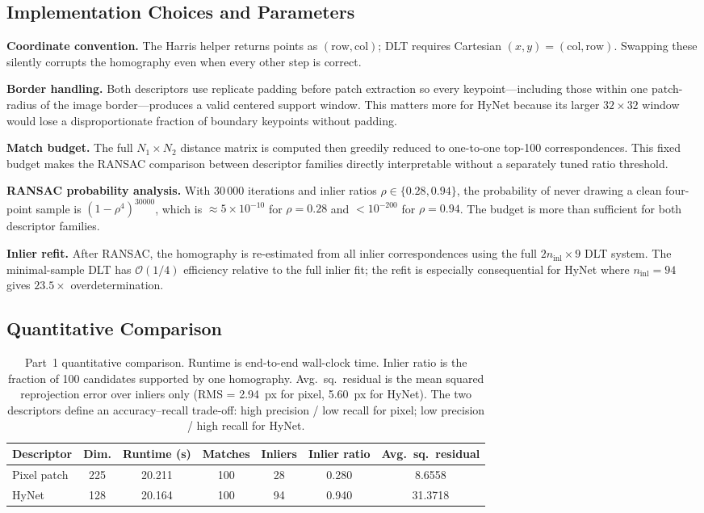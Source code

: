 {\subsection*{Implementation Choices and Parameters}

\textbf{Coordinate convention.}  The Harris helper returns points as
$(\mathrm{row}, \mathrm{col})$; DLT requires Cartesian $(x, y) =
(\mathrm{col}, \mathrm{row})$.  Swapping these silently corrupts the homography
even when every other step is correct.

\textbf{Border handling.}  Both descriptors use replicate padding before patch
extraction so every keypoint---including those within one patch-radius of the
image border---produces a valid centered support window.  This matters more
for HyNet because its larger $32{\times}32$ window would lose a
disproportionate fraction of boundary keypoints without padding.

\textbf{Match budget.}  The full $N_1 \times N_2$ distance matrix is computed
then greedily reduced to one-to-one top-100 correspondences.  This fixed budget
makes the RANSAC comparison between descriptor families directly interpretable
without a separately tuned ratio threshold.

\textbf{RANSAC probability analysis.}  With 30\,000 iterations and inlier ratios
$\rho \in \{0.28, 0.94\}$, the probability of never drawing a clean four-point
sample is $(1-\rho^4)^{30000}$, which is $\approx 5 \times 10^{-10}$ for
$\rho = 0.28$ and $< 10^{-200}$ for $\rho = 0.94$.  The budget is more than
sufficient for both descriptor families.

\textbf{Inlier refit.}  After RANSAC, the homography is re-estimated from all
inlier correspondences using the full $2n_{\mathrm{inl}} \times 9$ DLT system.
The minimal-sample DLT has $\mathcal{O}(1/4)$ efficiency relative to the full
inlier fit; the refit is especially consequential for HyNet where $n_{\mathrm{inl}} = 94$
gives $23.5\times$ overdetermination.

\subsection*{Quantitative Comparison}

\begin{table}[htbp]
\centering
\small
\begin{tabular}{l|c|c|c|c|c|c}
\hline
Descriptor & Dim. & Runtime (s) & Matches & Inliers & Inlier ratio & Avg.\ sq.\ residual \\
\hline
Pixel patch & 225  & 20.211 & 100 & 28 & 0.280 & 8.6558 \\
HyNet       & 128  & 20.164 & 100 & 94 & 0.940 & 31.3718 \\
\hline
\end{tabular}
\caption{Part~1 quantitative comparison.  Runtime is end-to-end wall-clock time.
Inlier ratio is the fraction of 100 candidates supported by one homography.
Avg.\ sq.\ residual is the mean squared reprojection error over inliers only
(RMS = 2.94~px for pixel, 5.60~px for HyNet).
The two descriptors define an accuracy--recall trade-off:
high precision / low recall for pixel; low precision / high recall for HyNet.}
\label{tab:part1_quant}
\end{table}

}

